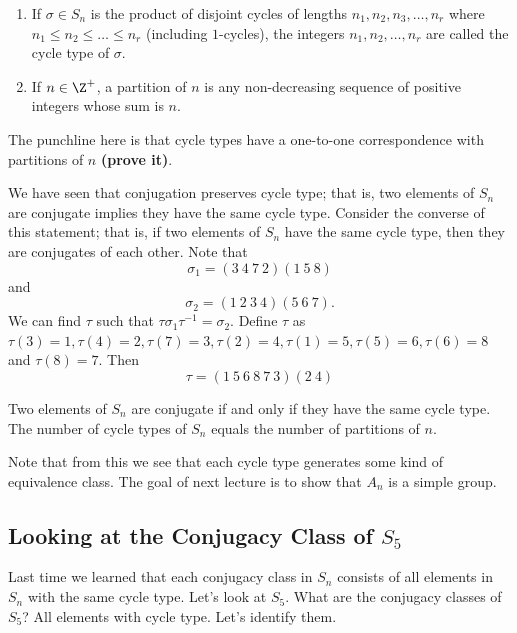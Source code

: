 \begin{definition}[ ]
   \begin{enumerate}
       \item[(1)] If \( \sigma \in {S}_{n} \) is the product of disjoint cycles of lengths \( {n}_{1}, {n}_{2}, {n}_{3}, \dots, {n}_{r}  \) where \( {n}_{1} \leq {n}_{2} \leq \dots \leq {n}_{r} \) (including \( 1  \)-cycles), the integers \( {n}_{1}, {n}_{2}, \dots, {n}_{r} \) are called the cycle type of \( \sigma \).
       \item[(2)]
    If \( n \in \Z^{+} \), a partition of \( n  \) is any non-decreasing sequence of positive integers whose sum is \( n  \). 
   \end{enumerate} 
\end{definition}

The punchline here is that cycle types have a one-to-one correspondence with partitions of \( n  \) \textbf{(prove it)}.

We have seen that conjugation preserves cycle type; that is, two elements of \( {S}_{n} \) are conjugate implies they have the same cycle type. Consider the converse of this statement; that is, if two elements of \( {S}_{n} \) have the same cycle type, then they are conjugates of each other. Note that  
\[  {\sigma}_{1} = (3 \ 4 \ 7 \ 2)(1 \ 5 \ 8) \]
and
\[  {\sigma}_{2} = (1 \ 2 \ 3 \ 4)(5 \ 6 \ 7). \]
We can find \( \tau \) such that \( \tau {\sigma}_{1} \tau^{-1} = {\sigma}_{2}. \)
Define \( \tau  \) as \( \tau(3) = 1  , \tau(4) = 2  , \tau(7) = 3 , \tau(2) = 4, \tau(1) = 5 , \tau(5) = 6, \tau(6) = 8 \) and \( \tau(8) = 7  \).
Then 
\[  \tau = (1 \ 5 \ 6  \ 8 \ 7 \ 3)(2 \ 4) \]

\begin{prop}
   Two elements of \( {S}_{n} \) are conjugate if and only if they have the same cycle type. The number of cycle types of \( {S}_{n} \) equals the number of partitions of \( n  \).
\end{prop}

Note that from this we see that each cycle type generates some kind of equivalence class. The goal of next lecture is to show that \( {A}_{n} \) is a simple group.

\subsection{Looking at the Conjugacy Class of \( {S}_{5} \)}
Last time we learned that each conjugacy class in \( {S}_{n} \) consists of all elements in \( {S}_{n} \) with the same cycle type. Let's look at \( {S}_{5} \). What are the conjugacy classes of \( {S}_{5} \)? All elements with cycle type. Let's identify them. 

